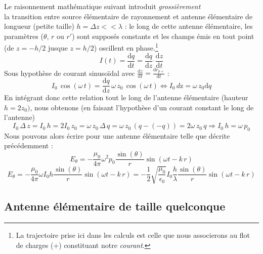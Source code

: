 Le raisonnement mathématique suivant introduit \textit{grossièrement} \\la transition entre source élémentaire de rayonnement et antenne élémentaire de longueur (petite taille) $ h = \Delta z << \lambda$ : le long de cette antenne élémentaire, les paramètres ($\theta$, $r$ ou $r'$) sont supposés constants et les champs émis en tout point (de $z=-h/2$ jusque $z=h/2$) oscillent en phase.\footnote{La trajectoire prise ici dans les calculs est celle que nous associerons au flot de charges (+) constituant notre \textit{courant}.} \[ I(t) = \frac{\textrm{d}q}{\textrm{d}t} = \frac{\textrm{d}q}{\textrm{d}z}\,\dot\,\frac{\textrm{d}z}{\textrm{d}t}\] Sous hypothèse de courant sinusoïdal avec $\frac{\textrm{d}z}{\textrm{d}t} = \frac{\textrm{d}r_{p+}}{\textrm{d}t}$ :
\[I_{0}\,\cos(\omega\,t) = \frac{\textrm{d}q}{\textrm{d}z}\,\omega\,z_0\,\cos(\omega\,t) \Leftrightarrow I_0\,d\textrm{z} =\omega \, z_0 \textrm{d}q \]
En intégrant donc cette relation tout le long de l'antenne élémentaire (hauteur $h = 2z_0)$, nous obtenons (en faisant l'hypothèse d'un courant constant le long de l'antenne) \[ I_0\,\Delta\,z = I_0 \,h = 2I_0\,z_0 = \omega \,z_0\,\Delta\,q = \omega\, z_0 \, (q-(-q)) = 2\omega\,z_0\,q \Rightarrow I_0\,h = \omega\,p_0\]
Nous pouvons alors écrire pour une antenne élémentaire telle que décrite précédemment : 
\[ E_\theta = -\frac{\mu_0}{4\pi}\omega^2p_0\frac{\sin(\theta)}{r}\sin(\omega t-k\,r)\]
\[ E_\theta = -\frac{\mu_0}{4\pi}\omega I_0h\frac{\sin(\theta)}{r}\sin(\omega t-k\,r) =  -\frac{1}{2}\sqrt{\frac{\mu_0}{\epsilon_0}}I_0 \frac{h}{\lambda}\frac{\sin(\theta)}{r}\sin(\omega t-k\, r)\]



\subsection{Antenne élémentaire de taille quelconque}

